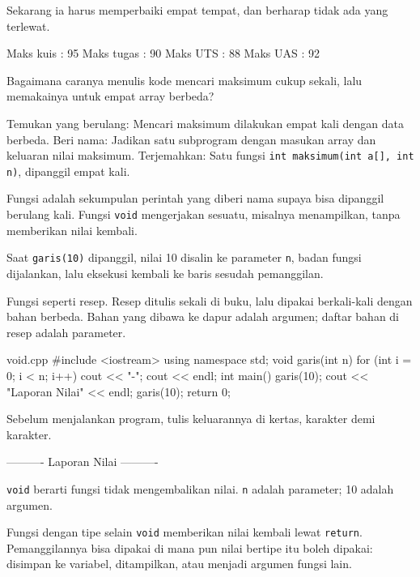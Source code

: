 \documentclass[a4paper]{article}
\begin{document}
Sekarang ia harus memperbaiki empat tempat, dan berharap tidak ada yang terlewat.

\begin{MKeluaran}[title={Tampilan yang diinginkan}]
Maks kuis  : 95
Maks tugas : 90
Maks UTS   : 88
Maks UAS   : 92
\end{MKeluaran}
\begin{Tebak}
Bagaimana caranya menulis kode mencari maksimum cukup sekali, lalu memakainya untuk empat array berbeda?
\end{Tebak}
\begin{Jawaban}
Temukan yang berulang: Mencari maksimum dilakukan empat kali dengan data berbeda. Beri nama: Jadikan satu subprogram dengan masukan array dan keluaran nilai maksimum. Terjemahkan: Satu fungsi \texttt{int maksimum(int a[], int n)}, dipanggil empat kali.
\end{Jawaban}
Fungsi adalah sekumpulan perintah yang diberi nama supaya bisa dipanggil berulang kali. Fungsi \texttt{void} mengerjakan sesuatu, misalnya menampilkan, tanpa memberikan nilai kembali.

Saat \texttt{garis(10)} dipanggil, nilai 10 disalin ke parameter \texttt{n}, badan fungsi dijalankan, lalu eksekusi kembali ke baris sesudah pemanggilan.

\begin{Contoh}
Fungsi seperti resep. Resep ditulis sekali di buku, lalu dipakai berkali-kali dengan bahan berbeda. Bahan yang dibawa ke dapur adalah argumen; daftar bahan di resep adalah parameter.
\end{Contoh}
\begin{MKode}{void.cpp}
#include <iostream>
using namespace std;
void garis(int n) {
    for (int i = 0; i < n; i++) cout << "-";
    cout << endl;
}
int main() {
    garis(10);
    cout << "Laporan Nilai" << endl;
    garis(10);
    return 0;
}
\end{MKode}
\begin{Tebak}[]
Sebelum menjalankan program, tulis keluarannya di kertas, karakter demi karakter.
\end{Tebak}
\begin{Jawaban}[]
\begin{MKeluaran}[]
----------
Laporan Nilai
----------
\end{MKeluaran}
\texttt{void} berarti fungsi tidak mengembalikan nilai. \texttt{n} adalah parameter; 10 adalah argumen.
\end{Jawaban}
Fungsi dengan tipe selain \texttt{void} memberikan nilai kembali lewat \texttt{return}. Pemanggilannya bisa dipakai di mana pun nilai bertipe itu boleh dipakai: disimpan ke variabel, ditampilkan, atau menjadi argumen fungsi lain.
\end{document}
